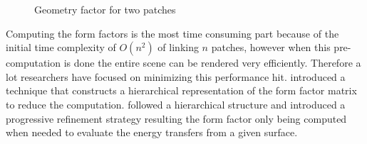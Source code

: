 

\begin{figure}[ht]
    \centering
    \renewcommand{\thefigure}{\thechapter.\arabic{figure}}
    \caption[Form factor geometry for two patches]{Geometry factor for two patches}
    \label{fig:form_factor}
\end{figure}

Computing the form factors is the most time consuming part because of the initial time complexity of \(O(n^{2})\) of linking \(n\) patches, however when this pre-computation is done the entire scene can be rendered very efficiently. Therefore a lot researchers have focused on minimizing this performance hit. \citeauthor{Hanrahan:1991:RHR:127719.122740} \cite{Hanrahan:1991:RHR:127719.122740} introduced a technique that constructs a hierarchical representation of the form factor matrix to reduce the computation. \citeauthor{Holzschuch94anefficient} \cite{Holzschuch94anefficient} followed a hierarchical structure and introduced a progressive refinement strategy resulting the form factor only being computed when needed to evaluate the energy transfers from a given surface.

